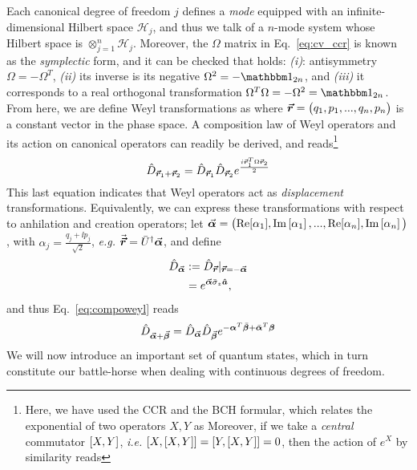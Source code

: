 Each canonical degree of freedom $j$ defines a \textit{mode} equipped with an infinite-dimensional Hilbert space $\mathcal{H}_j$, and thus we talk of a $n$-mode system whose Hilbert space is $\otimes_{j=1}^n \mathcal{H}_j$. Moreover, the $\Omega$ matrix in Eq.~\ref{eq:cv_ccr} is known as the \textit{symplectic} form, and it can be checked that holds: \textit{(i)}: antisymmetry $\Omega = - \Omega^T$, \textit{(ii)} its inverse is its negative  $\Omega^2 = - \id_{2n}$, and \textit{(iii)} it corresponds to a real orthogonal transformation $\Omega^T \Omega = -\Omega^2 = \id_{2n}$.
From here, we are define Weyl transformations as
where $\bm{\vec{r}}=\big(q_1, p_1, ..., q_n, p_n\big)$ is a constant vector in the phase space.%
A composition law of Weyl operators and its action on canonical operators can readily be derived, and reads\footnote{Here, we have used the CCR and the BCH formular, which relates the exponential of two operators $X,Y$ as Moreover, if we take a \textit{central} commutator $\left[X,Y\right]$, \textit{i.e.} $\left[X,\left[X,Y\right]\right] = \left[Y,\left[X,Y\right]\right] = 0$, then the action of $e^{X}$ by similarity reads }
\begin{equation}\label{eq:compoweyl}
\hat{D}_{\bm{\vec{r}}_1 + \bm{\vec{r}}_2}  = \hat{D}_{\bm{\vec{r}}_{1}} \hat{D}_{\bm{\vec{r}}_{2}}  e^{\frac{i \bm{\vec{r}}_1^T \Omega \bm{\vec{r}}_2}{2}}
\end{equation}
This last equation indicates that Weyl operators act as \textit{displacement} transformations. Equivalently, we can express these transformations with respect to anhilation and creation operators; let $\vec{\bm{\alpha}} = \big(\text{Re}[\alpha_1], \text{Im}\left[\alpha_1\right], ..., \text{Re}[\alpha_n], \text{Im}\left[\alpha_n\right] \big)$, with $\alpha_j = \frac{q_j + \ii p_j}{\sqrt{2}}$, \textit{e.g.} $\vec{\bm{\vec{r}}} = \bar{U}^\dagger \vec{\bm{\alpha}}$,
and define
\begin{align}\label{eq:weyladag}
\hat{D}_{\vec{\bm{\alpha}}} &:= \hat{D}_{\bm{\vec{r}}}|_{\bm{\vec{r}}=-\vec{\bm{\alpha}}} \\
&= e^{\vec{\bm{\alpha}} \bar{\sigma}_z \bm{\hat{a}}},
\end{align}
and thus Eq.~\ref{eq:compoweyl} reads
\begin{align}\label{eq:weylaop}
\hat{D}_{\vec{\bm{\alpha}}+\vec{\bm{\beta}}} =\hat{D}_{\vec{\bm{\alpha}}} \hat{D}_{\vec{\bm{\beta}}} e^{-\bm{\alpha}^T \bar{\bm{\beta}} + \bar{\bm{\alpha}}^T \bm{\beta}}
\end{align}
We will now introduce an important set of quantum states, which in turn constitute our battle-horse when dealing with continuous degrees of freedom.
